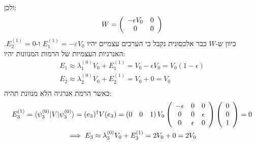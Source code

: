 \documentclass{tstextbook}
\begin{document}
\begin{example}
\begin{gather*}
\end{gather*}
ולכן:
$$W=\left(\begin{array}{c c}{{-\epsilon V_{0}}}&{{0}}\\ {{0}}&{{0}}\end{array}\right)$$
כיוון ש-\(W\) כבר אלכסונית נקבל כי הערכים עצמיים יהיו \(E_{1}^{(1)}=-\varepsilon V_{0}\) ו-\(E_{2}^{(1)}=0\). האנרגיות העצמיות של הרמות המנוונות יהיו:
\begin{gather*}E_{1}\approx\lambda_{1}^{(0)}V_{0}+E_{1}^{(1)}=V_{0}-\epsilon V_{0}=V_{0}\left( 1-\epsilon \right)\\ E_{2}\approx\lambda_{2}^{(0)}V_{0}+E_{2}^{(1)}=V_{0}+0=V_{0}\\
\end{gather*}
כאשר הרמת אנרגיה הלא מנוונת תהיה:
\begin{gather*}E_{3}^{(1)}=\langle \psi_{3}^{(0)}|V|\psi_{3}^{(0)} \rangle=(e_{3})^{\dagger}V(e_{3})=\left(0\quad0\quad1\right)V_{0}\left(\begin{array}{c c c}{{-\epsilon}}&{{0}}&{{0}}\\ {{0}}&{{0}}&{{\epsilon}}\\ {{0}}&{{\epsilon}}&{{0}}\end{array}\right)\left(\begin{array}{c}{{0}}\\ {{0}}\\ {{1}}\end{array}\right)=0\\ \implies E_{3}\approx\lambda_{3}^{(0)}V_{0}+E_{3}^{(1)}=2V_{0}+0=2V_{0}
\end{gather*}

\end{example}
\end{document}
